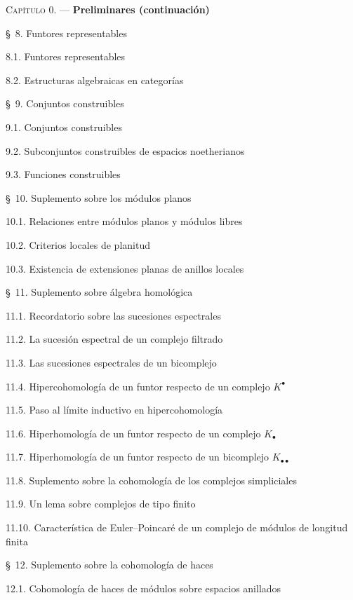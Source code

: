 \begin{flushleft}
\textsc{Capítulo 0.} --- \textbf{Preliminares (continuación)} 

\medskip
\S~8. Funtores representables 

8.1. Funtores representables 

8.2. Estructuras algebraicas en categorías 

\medskip
\S~9. Conjuntos construibles 

9.1. Conjuntos construibles 

9.2. Subconjuntos construibles de espacios noetherianos 

9.3. Funciones construibles 

\medskip
\S~10. Suplemento sobre los módulos planos 

10.1. Relaciones entre módulos planos y módulos libres 

10.2. Criterios locales de planitud 

10.3. Existencia de extensiones planas de anillos locales 

\medskip
\S~11. Suplemento sobre álgebra homológica 

11.1. Recordatorio sobre las sucesiones espectrales 

11.2. La sucesión espectral de un complejo filtrado 

11.3. Las sucesiones espectrales de un bicomplejo 

11.4. Hipercohomología de un funtor respecto de un complejo $K^\bullet$

11.5. Paso al límite inductivo en hipercohomología 

11.6. Hiperhomología de un funtor respecto de un complejo $K_\bullet$

11.7. Hiperhomología de un funtor respecto de un bicomplejo
$K_{\bullet\bullet}$ 

11.8. Suplemento sobre la cohomología de los complejos simpliciales 

11.9. Un lema sobre complejos de tipo finito 

11.10. Característica de Euler--Poincaré de un complejo de módulos de longitud finita

\medskip
\S~12. Suplemento sobre la cohomología de haces 

12.1. Cohomología de haces de módulos sobre espacios anillados 


\end{flushleft}
